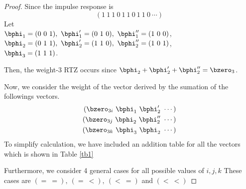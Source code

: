 \documentclass[11pt, oneside, dvipdfmx]{book}
\begin{document}
\begin{proof}
Since the impulse response is
\[
(1~1~1~0~1~1~0~1~1~0~\cdots)
\]
Let \\$\bphi_1=(0~0~1),~\bphi'_1=(0~1~0),~\bphi''_1=(1~0~0)$, \\
$\bphi_2=(0~1~1),~\bphi'_2=(1~1~0),~\bphi''_2=(1~0~1)$, \\
$\bphi_3=(1~1~1)$. 

Then, the weight-3 RTZ occurs since $\bphi_2+\bphi'_2+\bphi''_2=\bzero_3$. 

Now, we consider the weight of the vector derived by the sumation of the followings vectors.
\begin{eqnarray*}
(\bzero_{3i}~\bphi_1~\bphi'_2~\cdots)\cr
(\bzero_{3j}~\bphi_2~\bphi''_2~\cdots)\cr
(\bzero_{3k}~\bphi_3~\bphi_2~\cdots)
\end{eqnarray*}
To simplify calculation, we have included an addition table for all the vectors which is shown in Table \ref{tb1}

\begin{table}[h!]
\centering
{}
\caption{Truth Table}
\label{tb1}
\end{table}
Furthermore, we consider 4 general cases for all possible values of $i,j,k$ These cases are $(=~=),~(=~<),~(<~=)$ and $(<~<)$

\end{proof}
\end{document}

